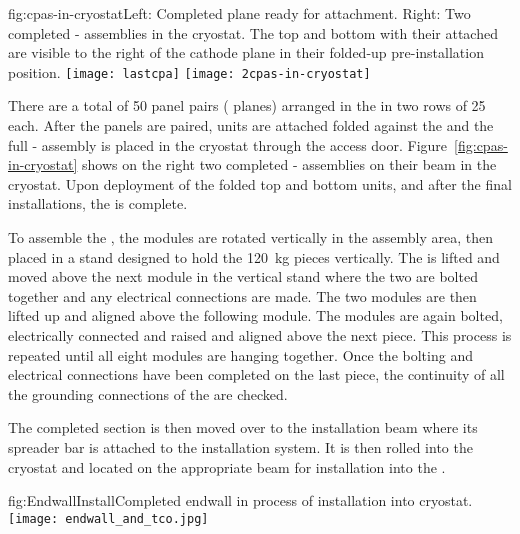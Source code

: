 \begin{dunefigure}{fig:cpas-in-cryostat}{Left: Completed   plane ready for  attachment. Right: Two completed - assemblies in the  cryostat. The top and bottom  with their  attached are visible to the right of the cathode plane in their folded-up pre-installation position.}
\texttt{[image: lastcpa]}
\texttt{[image: 2cpas-in-cryostat]}
\end{dunefigure}

There are a total of 50  panel pairs ( planes) arranged in the %
 in two rows of 25 each.  After the panels are paired,  units are attached folded against the  and the full - assembly is placed in the  cryostat through the access door.  Figure~\ref{fig:cpas-in-cryostat} shows on the right two completed - assemblies on their beam in the  cryostat. Upon deployment of the folded top and bottom  units, and after the final  installations, the   is complete.

To assemble the , the modules are rotated vertically in the assembly area, then placed in a stand designed to hold the \SI{120}{\kg} pieces vertically. The  is lifted and moved above the next module in the vertical stand where the two are bolted together and any electrical connections are made. The two modules are then lifted up and aligned above the following module.  The modules are again bolted, electrically connected and raised and aligned above the next piece.  This process is repeated until all eight modules are hanging together.  Once the bolting and electrical connections have been completed on the last piece, the continuity of all the grounding connections of the  are checked.
 
The completed  section is then moved over to the installation beam where its spreader bar is attached to the installation system.  It is then rolled into the cryostat and located on the appropriate beam for installation into the .

\begin{dunefigure}{fig:EndwallInstall}{Completed endwall in process of installation into  cryostat.}
\texttt{[image: endwall\_and\_tco.jpg]}
\end{dunefigure}



